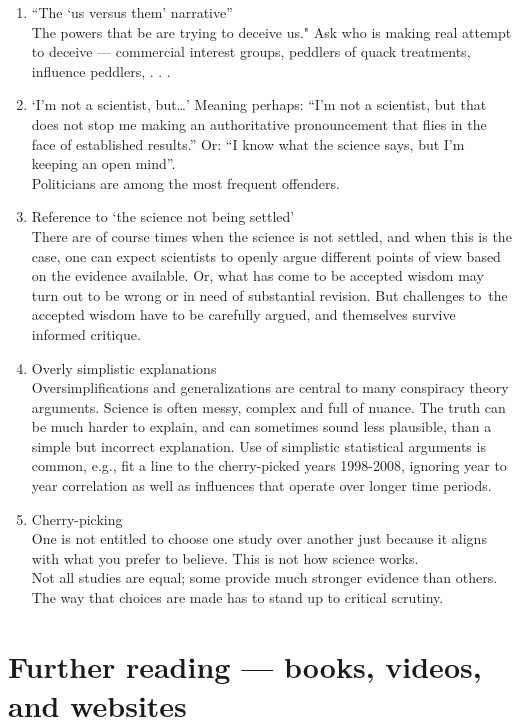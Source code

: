 \documentclass[
  10pt,
  b5paper]{book}
\providecommand{\tightlist}{%
  \setlength{\itemsep}{0pt}\setlength{\parskip}{0pt}}
\begin{document}
\begin{enumerate}
\def\labelenumi{\arabic{enumi}.}
\tightlist
\item
  ``The `us versus them' narrative''\\
  The powers that be are trying to deceive us." Ask who is
  making real attempt to deceive --- commercial interest groups,
  peddlers of quack treatments, influence peddlers, . . .
\item
  `I'm not a scientist, but\ldots{}'
  Meaning perhaps: ``I'm not a scientist, but that does not stop me
  making an authoritative pronouncement that flies in the face of
  established results.''
  Or: ``I know what the science says, but I'm keeping an open mind''.\\
  Politicians are among the most frequent offenders.
\item
  Reference to `the science not being settled'\\
  There are of course times when the science is not settled, and when this is
  the case, one can expect scientists to openly argue different points of view
  based on the evidence available. Or, what has come to be accepted wisdom
  may turn out to be wrong or in need of substantial revision. But challenges
  to~the accepted wisdom have to be carefully argued, and themselves survive
  informed critique.
\item
  Overly simplistic explanations\\
  Oversimplifications and generalizations are central to many conspiracy theory
  arguments. Science is often messy, complex and full of nuance. The truth can
  be much harder to explain, and can sometimes sound less plausible, than a
  simple but incorrect explanation. Use of simplistic statistical arguments
  is common, e.g., fit a line to the cherry-picked years 1998-2008, ignoring
  year to year correlation as well as influences that operate over longer time
  periods.
\item
  Cherry-picking\\
  One is not entitled to choose one study over another just because it aligns
  with what you prefer to believe. This is not how science works.\\
  Not all studies are equal; some provide much stronger evidence than others.
  The way that choices are made has to stand up to critical scrutiny.
\end{enumerate}

\hypertarget{further-reading-books-videos-and-websites}{%
\chapter*{Further reading --- books, videos, and websites}\label{further-reading-books-videos-and-websites}}
\end{document}
